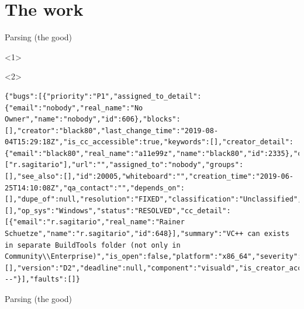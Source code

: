 \documentclass[aspectratio=169,notes]{beamer}
\begin{document}
	\section{The work}
	\begin{frame}[fragile]{Parsing (the good)}
		
		\begin{onlyenv}<1>
			\vspace{3.85cm}
		\end{onlyenv}
		\begin{onlyenv}<2>
\begin{lstlisting}[basicstyle=\tiny\ttfamily,numbers=none]
{"bugs":[{"priority":"P1","assigned_to_detail":{"email":"nobody","real_name":"No Owner","name":"nobody","id":606},"blocks":[],"creator":"black80","last_change_time":"2019-08-04T15:29:18Z","is_cc_accessible":true,"keywords":[],"creator_detail":{"email":"black80","real_name":"a11e99z","name":"black80","id":2335},"cc":["r.sagitario"],"url":"","assigned_to":"nobody","groups":[],"see_also":[],"id":20005,"whiteboard":"","creation_time":"2019-06-25T14:10:08Z","qa_contact":"","depends_on":[],"dupe_of":null,"resolution":"FIXED","classification":"Unclassified","alias":[],"op_sys":"Windows","status":"RESOLVED","cc_detail":[{"email":"r.sagitario","real_name":"Rainer Schuetze","name":"r.sagitario","id":648}],"summary":"VC++ can exists in separate BuildTools folder (not only in Community\\Enterprise)","is_open":false,"platform":"x86_64","severity":"enhancement","flags":[],"version":"D2","deadline":null,"component":"visuald","is_creator_accessible":true,"product":"D","is_confirmed":true,"target_milestone":"---"}],"faults":[]}
		\end{lstlisting}
		\end{onlyenv}
	\end{frame}
	\begin{frame}[fragile]{Parsing (the good)}
			
	\end{frame}
\end{document}
